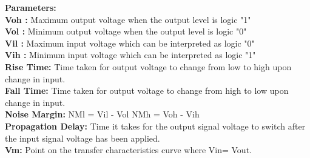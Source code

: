 \documentclass[12pt,a4paper]{article}
\begin{document}
\textbf{Parameters:}  
\\ \textbf{Voh :} Maximum output voltage when the output level is logic "1" \\ \textbf{Vol :} Minimum output voltage when the output level is logic "0"  
\\ \textbf{Vil :} Maximum input voltage which can be interpreted as logic "0"  
\\ \textbf{Vih :} Minimum input voltage which can be interpreted as logic "1"  
\\ \textbf{Rise Time:} Time taken for output voltage to change from low to high upon change in input. 
\\ \textbf{Fall Time:} Time taken for output voltage to change from high to low upon change in input.  
\\ \textbf{Noise Margin:}  NMl = Vil - Vol  NMh = Voh - Vih
\\ \textbf{Propagation Delay:} Time it takes for the output signal voltage to switch after the input signal voltage has been applied.  
\\ \textbf{Vm:} Point on the transfer characteristics curve where Vin= Vout. 
\end{document}
